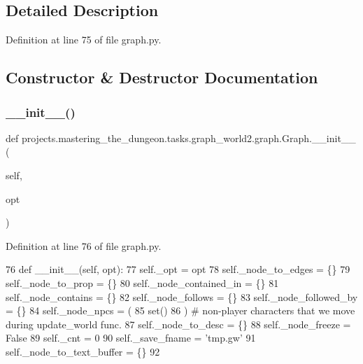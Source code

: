 \subsection{Detailed Description}


Definition at line 75 of file graph.\+py.



\subsection{Constructor \& Destructor Documentation}
\mbox{\label{classprojects_1_1mastering__the__dungeon_1_1tasks_1_1graph__world2_1_1graph_1_1Graph_ab78f8e7e877bd4aef992c075fcbd13d1}} 
\subsubsection{\texorpdfstring{\+\_\+\+\_\+init\+\_\+\+\_\+()}{\_\_init\_\_()}}
{\footnotesize\ttfamily def projects.\+mastering\+\_\+the\+\_\+dungeon.\+tasks.\+graph\+\_\+world2.\+graph.\+Graph.\+\_\+\+\_\+init\+\_\+\+\_\+ (\begin{DoxyParamCaption}\item[{}]{self,  }\item[{}]{opt }\end{DoxyParamCaption})}



Definition at line 76 of file graph.\+py.


\begin{DoxyCode}
76     \textcolor{keyword}{def }\_\_init\_\_(self, opt):
77         self.\_opt = opt
78         self.\_node\_to\_edges = \{\}
79         self.\_node\_to\_prop = \{\}
80         self.\_node\_contained\_in = \{\}
81         self.\_node\_contains = \{\}
82         self.\_node\_follows = \{\}
83         self.\_node\_followed\_by = \{\}
84         self.\_node\_npcs = (
85             set()
86         )  \textcolor{comment}{# non-player characters that we move during update\_world func.}
87         self.\_node\_to\_desc = \{\}
88         self.\_node\_freeze = \textcolor{keyword}{False}
89         self.\_cnt = 0
90         self.\_save\_fname = \textcolor{stringliteral}{'tmp.gw'}
91         self.\_node\_to\_text\_buffer = \{\}
92 
\end{DoxyCode}


